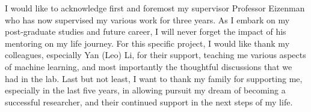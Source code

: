 \documentclass[onehalfspaced, 12pt, normalmargins]{ut-thesis}
\begin{document}
\begin{preliminary}



\begin{acknowledgements}
I would like to acknowledge first and foremost my supervisor Professor Eizenman who has now supervised my various work for three years. As I embark on my post-graduate studies and future career, I will never forget the impact of his mentoring on my life journey. For this specific project, I would like thank my colleagues, especially Yan (Leo) Li, for their support, teaching me various aspects of machine learning, and most importantly the thoughtful discussions that we had in the lab. Last but not least, I want to thank my family for supporting me, especially in the last five years, in allowing pursuit my dream of becoming a successful researcher, and their continued support in the next steps of my life. 
\end{acknowledgements}

\tableofcontents

\listoftables

\listoffigures



\end{preliminary}
\end{document}
